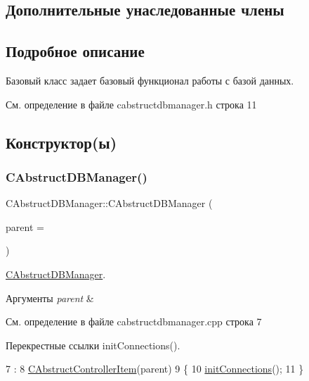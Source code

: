 \subsection*{Дополнительные унаследованные члены}


\subsection{Подробное описание}
Базовый класс задает базовый функционал работы с базой данных. 

См. определение в файле cabstructdbmanager.\+h строка 11



\subsection{Конструктор(ы)}
\hypertarget{class_c_abstruct_d_b_manager_a53c2018cfa7a1a24bacd747967509bd7}{}\label{class_c_abstruct_d_b_manager_a53c2018cfa7a1a24bacd747967509bd7} 
\subsubsection{\texorpdfstring{C\+Abstruct\+D\+B\+Manager()}{CAbstructDBManager()}}
{\footnotesize\ttfamily C\+Abstruct\+D\+B\+Manager\+::\+C\+Abstruct\+D\+B\+Manager (\begin{DoxyParamCaption}\item[{Q\+Object $\ast$}]{parent = {} }\end{DoxyParamCaption})\hspace{0.3cm}{\ttfamily [explicit]}}



\hyperlink{class_c_abstruct_d_b_manager}{C\+Abstruct\+D\+B\+Manager}. 


\begin{DoxyParams}{Аргументы}
{\em parent} & \\
\hline
\end{DoxyParams}


См. определение в файле cabstructdbmanager.\+cpp строка 7



Перекрестные ссылки init\+Connections().


\begin{DoxyCode}
7                                                       :
8     \hyperlink{class_c_abstruct_controller_item_a1d99654a9522cc8721a329d1dcee35a4}{CAbstructControllerItem}(parent)
9 \{
10     \hyperlink{class_c_abstruct_d_b_manager_ad450c557df6d9a7dfcc4a37082f35659}{initConnections}();
11 \}
\end{DoxyCode}
\hypertarget{class_c_abstruct_d_b_manager_a75785e87f1f6dcb6cc2d48d4eced257b}{}\label{class_c_abstruct_d_b_manager_a75785e87f1f6dcb6cc2d48d4eced257b} 

